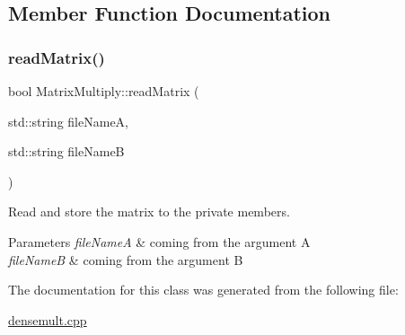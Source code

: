 \subsection{Member Function Documentation}
\mbox{\label{class_matrix_multiply_ac3eacd83dd8d01a13ee922dc9a5ac6aa}} 
\subsubsection{\texorpdfstring{read\+Matrix()}{readMatrix()}}
{\footnotesize\ttfamily bool Matrix\+Multiply\+::read\+Matrix (\begin{DoxyParamCaption}\item[{std\+::string}]{file\+NameA,  }\item[{std\+::string}]{file\+NameB }\end{DoxyParamCaption})\hspace{0.3cm}{\ttfamily [inline]}}



Read and store the matrix to the private members. 


\begin{DoxyParams}{Parameters}
{\em file\+NameA} & coming from the argument A \\
\hline
{\em file\+NameB} & coming from the argument B \\
\hline
\end{DoxyParams}


The documentation for this class was generated from the following file\+:\begin{DoxyCompactItemize}
\item 
\mbox{\hyperlink{densemult_8cpp}{densemult.\+cpp}}\end{DoxyCompactItemize}
